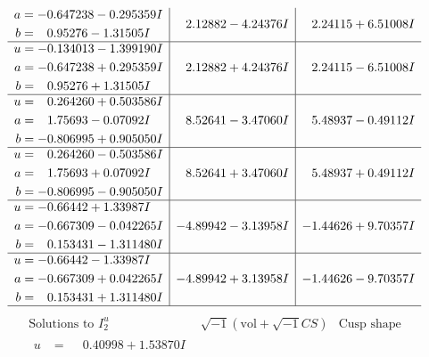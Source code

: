 \documentclass[1p]{elsarticle_modified}
\theoremstyle{definition}
\newcommand{\I}{\sqrt{-1}}
\begin{document}
$$\begin{array}{c|c|c}
\begin{aligned}
a &= -0.647238 - 0.295359 I \\
b &= \phantom{-}0.95276 - 1.31505 I\end{aligned}
 & \phantom{-}2.12882 - 4.24376 I & \phantom{-}2.24115 + 6.51008 I \\ \hline\begin{aligned}
u &= -0.134013 - 1.399190 I \\
a &= -0.647238 + 0.295359 I \\
b &= \phantom{-}0.95276 + 1.31505 I\end{aligned}
 & \phantom{-}2.12882 + 4.24376 I & \phantom{-}2.24115 - 6.51008 I \\ \hline\begin{aligned}
u &= \phantom{-}0.264260 + 0.503586 I \\
a &= \phantom{-}1.75693 - 0.07092 I \\
b &= -0.806995 + 0.905050 I\end{aligned}
 & \phantom{-}8.52641 - 3.47060 I & \phantom{-}5.48937 - 0.49112 I \\ \hline\begin{aligned}
u &= \phantom{-}0.264260 - 0.503586 I \\
a &= \phantom{-}1.75693 + 0.07092 I \\
b &= -0.806995 - 0.905050 I\end{aligned}
 & \phantom{-}8.52641 + 3.47060 I & \phantom{-}5.48937 + 0.49112 I \\ \hline\begin{aligned}
u &= -0.66442 + 1.33987 I \\
a &= -0.667309 - 0.042265 I \\
b &= \phantom{-}0.153431 - 1.311480 I\end{aligned}
 & -4.89942 - 3.13958 I & -1.44626 + 9.70357 I \\ \hline\begin{aligned}
u &= -0.66442 - 1.33987 I \\
a &= -0.667309 + 0.042265 I \\
b &= \phantom{-}0.153431 + 1.311480 I\end{aligned}
 & -4.89942 + 3.13958 I & -1.44626 - 9.70357 I\\
 \hline 
 \end{array}$$\newpage$$\begin{array}{c|c|c}  
\text{Solutions to }I^u_{2}& \I (\text{vol} + \sqrt{-1}CS) & \text{Cusp shape}\\
 \hline 
\begin{aligned}
u &= \phantom{-}0.40998 + 1.53870 I \\

\end{aligned}
\end{array}$$
\end{document}
